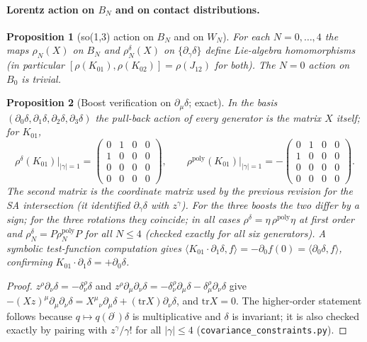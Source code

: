 \documentclass{article}
\newtheorem{proposition}{Proposition}
\theoremstyle{remark}
\begin{document}
\paragraph{Lorentz action on $B_N$ and on contact distributions.}
\begin{proposition}[so(1,3) action on $B_N$ and on $W_N$]
\label{prop:M7-rho}
For each $N=0,\ldots,4$ the maps $\rho_N(X)$ on $B_N$ and $\rho^\delta_N(X)$ on $\{\partial_\gamma\delta\}$ define Lie-algebra homomorphisms (in particular $[\rho(K_{01}),\rho(K_{02})]=\rho(J_{12})$ for both).
The $N=0$ action on $B_0$ is trivial.
\end{proposition}

\begin{proposition}[Boost verification on $\partial_\mu\delta$; exact]
\label{prop:M7-boost}
In the basis $(\partial_0\delta,\partial_1\delta,\partial_2\delta,\partial_3\delta)$ the pull-back action of every generator is the matrix $X$ itself; for $K_{01}$,
\[
\rho^\delta(K_{01})\big|_{|\gamma|=1}=\begin{pmatrix}0&1&0&0\\1&0&0&0\\0&0&0&0\\0&0&0&0\end{pmatrix},
\qquad
\rho^{\mathrm{poly}}(K_{01})\big|_{|\gamma|=1}=-\begin{pmatrix}0&1&0&0\\1&0&0&0\\0&0&0&0\\0&0&0&0\end{pmatrix}.
\]
The second matrix is the coordinate matrix used by the previous revision for the SA intersection (it identified $\partial_\gamma\delta$ with $z^\gamma$).
For the three boosts the two differ by a sign; for the three rotations they coincide; in all cases $\rho^\delta=\eta\,\rho^{\mathrm{poly}}\eta$ at first order and $\rho^\delta_N=P\rho^{\mathrm{poly}}_NP$ for all $N\le4$ (checked exactly for all six generators).
A symbolic test-function computation gives $\langle K_{01}\cdot\partial_1\delta,f\rangle=-\partial_0f(0)=\langle\partial_0\delta,f\rangle$, confirming $K_{01}\cdot\partial_1\delta=+\partial_0\delta$.
\end{proposition}

\begin{proof}
$z^\rho\partial_\nu\delta=-\delta^\rho_\nu\delta$ and $z^\rho\partial_\mu\partial_\nu\delta=-\delta^\rho_\nu\partial_\mu\delta-\delta^\rho_\mu\partial_\nu\delta$ give $-(Xz)^\mu\partial_\mu\partial_\nu\delta=X^\mu{}_\nu\partial_\mu\delta+(\mathrm{tr}X)\partial_\nu\delta$, and $\mathrm{tr}X=0$.
The higher-order statement follows because $q\mapsto q(\partial^\cdot)\delta$ is multiplicative and $\delta$ is invariant; it is also checked exactly by pairing with $z^\gamma/\gamma!$ for all $|\gamma|\le4$ (\texttt{covariance\_constraints.py}).
\end{proof}
\end{document}
